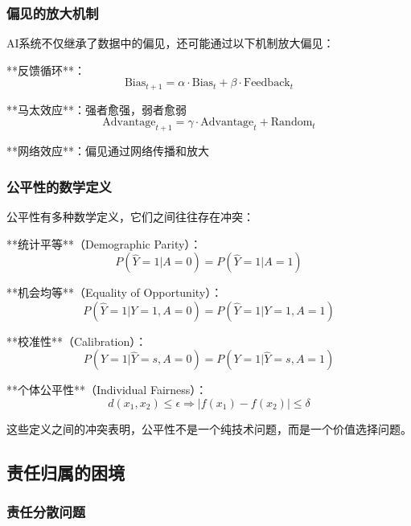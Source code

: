 \subsubsection{偏见的放大机制}

AI系统不仅继承了数据中的偏见，还可能通过以下机制放大偏见：

**反馈循环**：
\begin{equation}
\text{Bias}_{t+1} = \alpha \cdot \text{Bias}_t + \beta \cdot \text{Feedback}_t
\end{equation}

**马太效应**：强者愈强，弱者愈弱
\begin{equation}
\text{Advantage}_{t+1} = \gamma \cdot \text{Advantage}_t + \text{Random}_t
\end{equation}

**网络效应**：偏见通过网络传播和放大

\subsubsection{公平性的数学定义}

公平性有多种数学定义，它们之间往往存在冲突：

**统计平等**（Demographic Parity）：
\begin{equation}
P(\hat{Y} = 1|A = 0) = P(\hat{Y} = 1|A = 1)
\end{equation}

**机会均等**（Equality of Opportunity）：
\begin{equation}
P(\hat{Y} = 1|Y = 1, A = 0) = P(\hat{Y} = 1|Y = 1, A = 1)
\end{equation}

**校准性**（Calibration）：
\begin{equation}
P(Y = 1|\hat{Y} = s, A = 0) = P(Y = 1|\hat{Y} = s, A = 1)
\end{equation}

**个体公平性**（Individual Fairness）：
\begin{equation}
d(x_1, x_2) \leq \epsilon \Rightarrow |f(x_1) - f(x_2)| \leq \delta
\end{equation}

这些定义之间的冲突表明，公平性不是一个纯技术问题，而是一个价值选择问题。

\subsection{责任归属的困境}

\subsubsection{责任分散问题}

